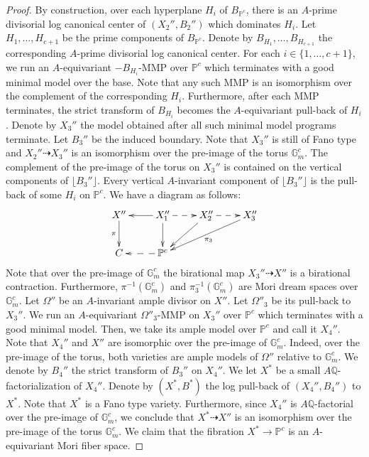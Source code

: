 \documentclass{amsart}
\newcommand{\pp}{\mathbb{P}}
\renewcommand{\qq}{\mathbb{Q}}
\theoremstyle{remark}
\numberwithin{equation}{section}
\begin{document}
\begin{proof}
By construction, over each hyperplane $H_i$ of $B_{\pp^c}$,
there is an $A$-prime divisorial log canonical center of $(X_2'',B_2'')$
which dominates $H_i$.
Let $H_1,\dots,H_{c+1}$ be the prime components of $B_{\pp^c}$.
Denote by $B_{H_1},\dots,B_{H_{c+1}}$ 
the corresponding $A$-prime divisorial log canonical center.
For each $i\in \{1,\dots,c+1\}$,
we run an $A$-equivariant $-B_{H_i}$-MMP over $\pp^c$ which terminates with a good minimal model over the base.
Note that any such MMP is an isomorphism over the complement of the corresponding $H_i$.
Furthermore, after each MMP terminates, 
the strict transform of $B_{H_i}$
becomes the $A$-equivariant pull-back of $H_i$.
Denote by $X_3''$ the model obtained after all such minimal model programs terminate.
Let $B_3''$ be the induced boundary.
Note that $X_3''$ is still of Fano type
and $X_2''\dashrightarrow X_3''$ is an isomorphism over the pre-image of the torus $\mathbb{G}_m^c$.
The complement of the pre-image of the torus on $X_3''$
is contained on the vertical components of $\lfloor B_3''\rfloor$.
Every vertical $A$-invariant component of $\lfloor B_3''\rfloor$
is the pull-back of some $H_i$ on $\pp^c$.
We have a diagram as follows:
\[
\xymatrix{
X''\ar[d]_-{\pi}  & X''_1\ar[l]\ar[d] \ar@{-->}[r] & X_2''\ar[ld] \ar@{-->}[r] & X_3''\ar[lld]^-{\pi_3} \\
C & \pp^c\ar@{-->}[l] \\
}
\]
Note that over the pre-image of $\mathbb{G}_m^c$ the birational map
$X_3''\dashrightarrow X''$ is a birational contraction.
Furthermore,
$\pi^{-1}(\mathbb{G}_m^c)$
and $\pi_3^{-1}(\mathbb{G}_m^c)$
are Mori dream spaces over $\mathbb{G}_m^c$.
Let $\Omega''$ be an $A$-invariant ample divisor on $X''$.
Let $\Omega''_3$ be its pull-back to $X_3''$.
We run an $A$-equivariant $\Omega''_3$-MMP on $X_3''$ over $\pp^c$
which terminates with a good minimal model.
Then, we take its ample model over $\pp^c$ and call it $X_4''$.
Note that $X_4''$ and $X''$ are isomorphic over the pre-image of $\mathbb{G}_m^c$.
Indeed, over the pre-image of the torus, both varieties are ample models of $\Omega''$ relative to $\mathbb{G}_m^c$.
We denote by $B_4''$ the strict transform of $B_3''$ on $X_4''$.
We let $X^*$ be a small $A\qq$-factorialization of $X_4''$.
Denote by $(X^*,B^*)$ the log pull-back of $(X_4'',B_4'')$ to $X^*$.
Note that $X^*$ is a Fano type variety.
Furthermore, since $X_4''$ is $A\qq$-factorial over the pre-image of $\mathbb{G}_m^c$,
we conclude that $X^*\dashrightarrow X''$ is an isomorphism over the pre-image of the torus $\mathbb{G}_m^c$.
We claim that the fibration $X^*\rightarrow \pp^c$ is an $A$-equivariant Mori fiber space.

\end{proof}
\end{document}

